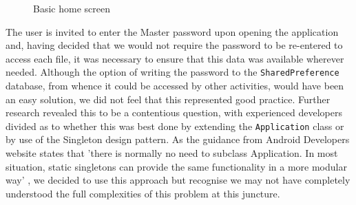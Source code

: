 \begin{figure}[h!]
                                                                                                                                                                                                         
    \caption{Basic home screen}
    \label{fig:main}
\end{figure}

The user is invited to enter the Master password upon opening the application and, having decided that we would not require the password to be re-entered to access each file, it was necessary to ensure that this data was available wherever needed. Although the option of writing the password to the  \texttt{SharedPreference} database, from whence it could be accessed by other activities, would have been an easy solution, we did not feel that this represented good practice.  Further research revealed this to be a contentious question, with experienced developers divided as to whether this was best done by extending the \texttt{Application} class or by use of the Singleton design pattern.  As the guidance from Android Developers website states that 'there is normally no need to subclass Application. In most situation, static singletons can provide the same functionality in a more modular way'   \citep{androiddev2} , we decided to use this approach but recognise we may not have completely understood the full complexities of this problem at this juncture.

